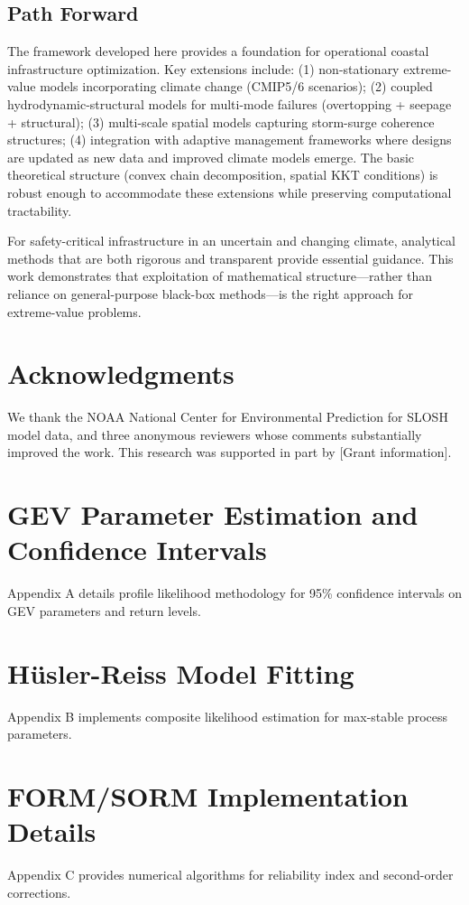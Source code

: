 \documentclass[review]{elsarticle}
\begin{document}
\subsection*{Path Forward}

The framework developed here provides a foundation for operational coastal infrastructure optimization. Key extensions include: (1) non-stationary extreme-value models incorporating climate change (CMIP5/6 scenarios); (2) coupled hydrodynamic-structural models for multi-mode failures (overtopping + seepage + structural); (3) multi-scale spatial models capturing storm-surge coherence structures; (4) integration with adaptive management frameworks where designs are updated as new data and improved climate models emerge. The basic theoretical structure (convex chain decomposition, spatial KKT conditions) is robust enough to accommodate these extensions while preserving computational tractability.

For safety-critical infrastructure in an uncertain and changing climate, analytical methods that are both rigorous and transparent provide essential guidance. This work demonstrates that exploitation of mathematical structure—rather than reliance on general-purpose black-box methods—is the right approach for extreme-value problems.

\section*{Acknowledgments}

We thank the NOAA National Center for Environmental Prediction for SLOSH model data, and three anonymous reviewers whose comments substantially improved the work. This research was supported in part by [Grant information].

\appendix

\section{GEV Parameter Estimation and Confidence Intervals}

Appendix A details profile likelihood methodology for 95\% confidence intervals on GEV parameters and return levels.

\section{Hüsler-Reiss Model Fitting}

Appendix B implements composite likelihood estimation for max-stable process parameters.

\section{FORM/SORM Implementation Details}

Appendix C provides numerical algorithms for reliability index and second-order corrections.



\end{document}

